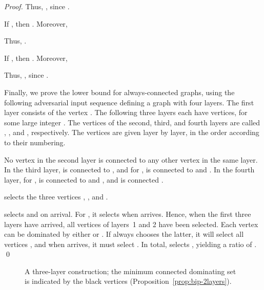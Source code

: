 \begin{proof}
Thus, , since .

If , then .
Moreover,

Thus, .

If , then .
Moreover,

Thus, , since .

Finally, we prove the lower bound for always-connected graphs, using
the following adversarial input sequence defining a graph  with four
layers.
The first layer consists of the vertex .
The following three layers each have  vertices, for some large
integer .
The vertices of the second, third, and fourth layers are called
, , and , respectively.
The vertices are given layer by layer, in the order according to their
numbering.

No vertex in the second layer is connected to any other vertex in the
same layer.
In the third layer,  is connected to , and for ,  is connected to  and .
In the fourth layer, for ,  is connected to
 and , and  is connected .

\onopt selects the three vertices , , and .

\alayersparent selects  and  on arrival.
For , it selects  when  arrives.
Hence, when the first three layers have arrived, all vertices of
layers~1 and 2 have been selected.
Each vertex  can be dominated by either  or
.
If \alayersparent always chooses the latter, it will select all
vertices , and when  arrives, it must select
.
In total, \alayersparent selects ,
yielding a ratio of . 
\qed\end{proof}

\begin{figure}[!htb]
\begin{center}
\caption{A three-layer construction;
the minimum connected dominating set is indicated by the black vertices
(Proposition~\ref{prop:bip-2layers}).}
\label{fig:two_layers}
\end{center}
\end{figure}


